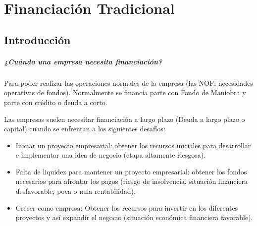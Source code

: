 \chapter{Financiación Tradicional}
\section{Introducción}
\paragraph{¿Cuándo una empresa necesita financiación?}
Para poder realizar las operaciones normales de la empresa (las NOF: necesidades operativas de fondos). Normalmente se financia parte con Fondo de Maniobra y parte con crédito o deuda a corto.

Las empresas suelen necesitar financiación a largo plazo (Deuda a largo plazo o capital) cuando se enfrentan a los siguientes desafíos:
\begin{itemize}
    \item Iniciar un proyecto empresarial: obtener los recursos iniciales para desarrollar e implementar una idea de negocio (etapa altamente riesgosa).
    \item Falta de liquidez para mantener un proyecto empresarial: obtener los fondos necesarios para afrontar los pagos (riesgo de insolvencia, situación financiera desfavorable, poca o nula rentabilidad).
    \item Crecer como empresa: Obtener los recursos para invertir en los diferentes proyectos y así expandir el negocio (situación económica financiera favorable).
\end{itemize}

